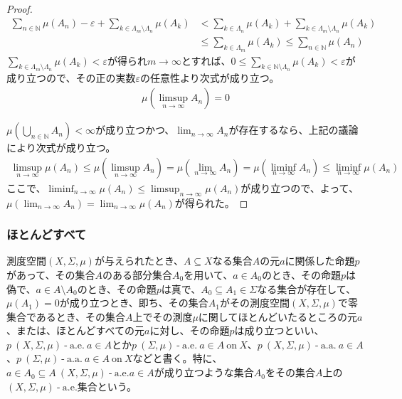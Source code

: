 \documentclass[dvipdfmx]{jsarticle}
\begin{document}
\begin{proof}
\begin{align*}
\sum_{n \in \mathbb{N}} {\mu\left( A_{n} \right)} - \varepsilon + \sum_{k \in \varLambda_{m} \setminus \varLambda_{n}} {\mu\left( A_{k} \right)} &< \sum_{k \in \varLambda_{n}} {\mu\left( A_{k} \right)} + \sum_{k \in \varLambda_{m} \setminus \varLambda_{n}} {\mu\left( A_{k} \right)}\\
&\leq \sum_{k \in \varLambda_{m}} {\mu\left( A_{k} \right)} \leq \sum_{n \in \mathbb{N}} {\mu\left( A_{n} \right)}
\end{align*}
$\sum_{k \in \varLambda_{m} \setminus \varLambda_{n}} {\mu\left( A_{k} \right)} < \varepsilon$が得られ$m \rightarrow \infty$とすれば、$0 \leq \sum_{k \in \mathbb{N} \setminus \varLambda_{n}} {\mu\left( A_{k} \right)} < \varepsilon$が成り立つので、その正の実数$\varepsilon$の任意性より次式が成り立つ。
\begin{align*}
\mu\left( \limsup_{n \rightarrow \infty}A_{n} \right) = 0
\end{align*}\par
$\mu\left( \bigcup_{n \in \mathbb{N}} A_{n} \right) < \infty$が成り立つかつ、$\lim_{n \rightarrow \infty}A_{n}$が存在するなら、上記の議論により次式が成り立つ。
\begin{align*}
\limsup_{n \rightarrow \infty}{\mu\left( A_{n} \right)} \leq \mu\left( \limsup_{n \rightarrow \infty}A_{n} \right) = \mu\left( \lim_{n \rightarrow \infty}A_{n} \right) = \mu\left( \liminf_{n \rightarrow \infty}A_{n} \right) \leq \liminf_{n \rightarrow \infty}{\mu\left( A_{n} \right)}
\end{align*}
ここで、$\liminf_{n \rightarrow \infty}{\mu\left( A_{n} \right)} \leq \limsup_{n \rightarrow \infty}{\mu\left( A_{n} \right)}$が成り立つので、よって、$\mu\left( \lim_{n \rightarrow \infty}A_{n} \right) = \lim_{n \rightarrow \infty}{\mu\left( A_{n} \right)}$が得られた。
\end{proof}
\subsubsection{ほとんどすべて}%
\begin{dfn}\label{ほとんどすべて}
測度空間$(X,\varSigma,\mu)$が与えられたとき、$A \subseteq X$なる集合$A$の元$a$に関係した命題$p$があって、その集合$A$のある部分集合$A_{0}$を用いて、$a \in A_{0}$のとき、その命題$p$は偽で、$a \in A \setminus A_{0}$のとき、その命題$p$は真で、$A_{0} \subseteq A_{1} \in \varSigma$なる集合が存在して、$\mu\left( A_{1} \right) = 0$が成り立つとき、即ち、その集合$A_{1}$がその測度空間$(X,\varSigma,\mu)$で零集合であるとき、その集合$A$上でその測度$\mu$に関してほとんどいたるところの元$a$、または、ほとんどすべての元$a$に対し、その命題$p$は成り立つといい、$p\ (X,\varSigma,\mu) \ \text{-} \ \mathrm{a.e.}\ a \in A$とか$p\ (\varSigma,\mu) \ \text{-} \ \mathrm{a.e.}\ a \in A\ \mathrm{on}\ X$、$p\ (X,\varSigma,\mu) \ \text{-} \ \mathrm{a.a.}\ a \in A$、$p\ (\varSigma,\mu) \ \text{-} \ \mathrm{a.a.}\ a \in A\ \mathrm{on}\ X$などと書く。特に、$a \in A_{0} \subseteq A\ (X,\varSigma,\mu) \ \text{-} \ \mathrm{a.e.}a \in A$が成り立つような集合$A_{0}$をその集合$A$上の$(X,\varSigma,\mu) \ \text{-} \ \mathrm{a.e.}$集合という。
\end{dfn}
\end{document}
